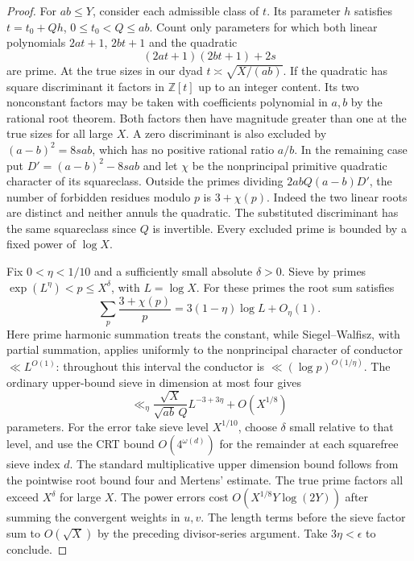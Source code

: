 \documentclass[11pt]{article}
\begin{document}
\begin{proof}
For \(ab\le Y\), consider each admissible class of \(t\).
Its parameter \(h\) satisfies \(t=t_0+Qh\), \(0\le t_0<Q\le ab\).
Count only parameters for which both linear polynomials \(2at+1\),
\(2bt+1\) and the quadratic
\[
       (2at+1)(2bt+1)+2s
\]
are prime. At the true sizes in our dyad \(t\asymp\sqrt{X/(ab)}\).
If the quadratic has square discriminant it factors in
\(\mathbb Z[t]\) up to an integer content. Its two nonconstant factors
may be taken with coefficients polynomial in \(a,b\) by the rational
root theorem. Both factors then have magnitude greater than one
at the true sizes for all large \(X\). A zero discriminant is also
excluded by \((a-b)^2=8s ab\), which has no positive rational ratio
\(a/b\). In the remaining case put \(D'=(a-b)^2-8s ab\) and let
\(\chi\) be the nonprincipal primitive quadratic character of its
squareclass. Outside the primes dividing \(2abQ(a-b)D'\), the number
of forbidden residues modulo \(p\) is \(3+\chi(p)\). Indeed the
two linear roots are distinct and neither annuls the quadratic.
The substituted discriminant has the same squareclass since \(Q\)
is invertible. Every excluded prime is bounded by a fixed power
of \(\log X\).

Fix \(0<\eta<1/10\) and a sufficiently small absolute \(\delta>0\).
Sieve by primes \(\exp(L^\eta)<p\le X^\delta\), with \(L=\log X\).
For these primes the root sum satisfies
\[
 \sum_p\frac{3+\chi(p)}p=3(1-\eta)\log L+O_\eta(1).
\]
Here prime harmonic summation treats the constant, while
Siegel--Walfisz, with partial summation, applies uniformly to the
nonprincipal character of conductor \(\ll L^{O(1)}\): throughout
this interval the conductor is \(\ll(\log p)^{O(1/\eta)}\).
The ordinary upper-bound sieve in dimension at most four
\cite[Chapter~19]{Kouk} gives
\[
 \ll_\eta \frac{\sqrt X}{\sqrt{ab}\,Q} L^{-3+3\eta}
             +O(X^{1/8})
\]
parameters. For the error take sieve level \(X^{1/10}\), choose
\(\delta\) small relative to that level, and use the CRT bound
\(O(4^{\omega(d)})\) for the remainder at each squarefree sieve
index \(d\). The standard multiplicative upper dimension bound
follows from the pointwise root bound four and Mertens' estimate.
The true prime factors all exceed \(X^\delta\) for large \(X\).
The power errors cost \(O(X^{1/8}Y\log(2Y))\) after summing the
convergent weights in \(u,v\). The length terms before the sieve
factor sum to \(O(\sqrt X)\) by the preceding divisor-series argument.
Take \(3\eta<\epsilon\) to conclude.
\end{proof}
\end{document}
